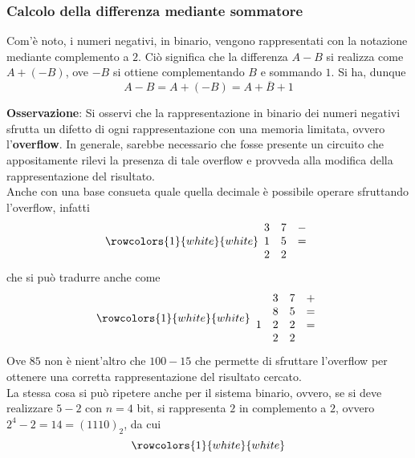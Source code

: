\documentclass[a4paper]{extarticle}
\begin{document}
\subsubsection{Calcolo della differenza mediante sommatore}
Com'è noto, i numeri negativi, in binario, vengono rappresentati con la notazione mediante complemento a \(2\). Ciò significa che la differenza \(A - B\) si realizza come \(A + (- B)\), ove \(- B\) si ottiene complementando \(B\) e sommando \(1\). Si ha, dunque
\[A - B = A + (- B) = A + \overline{B} + 1\]

\vspace{1em}
\noindent
\textbf{Osservazione}: Si osservi che la rappresentazione in binario dei numeri negativi sfrutta un difetto di ogni rappresentazione con una memoria limitata, ovvero l'\textbf{overflow}. In generale, sarebbe necessario che fosse presente un circuito che appositamente rilevi la presenza di tale overflow e provveda alla modifica della rappresentazione del risultato.\\
Anche con una base consueta quale quella decimale è possibile operare sfruttando l'overflow, infatti
\[
    \rowcolors{1}{white}{white}
    \begin{array}{rlc}
         3 & 7 & -\\
         1 & 5 & =\\
         2 & 2 &
    \end{array}
\]
che si può tradurre anche come
\[
    \rowcolors{1}{white}{white}
    \begin{array}{crlc}
         & 3 & 7 & +\\
         & 8 & 5 & =\\
         1 & 2 & 2 & =\\
         & 2 & 2 &
    \end{array}
\]
Ove \(85\) non è nient'altro che \(100 - 15\) che permette di sfruttare l'overflow per ottenere una corretta rappresentazione del risultato cercato.\\
La stessa cosa si può ripetere anche per il sistema binario, ovvero, se si deve realizzare \(5 - 2\) con \(n = 4\) bit, si rappresenta \(2\) in complemento a \(2\), ovvero \(2^4 - 2 = 14 = (1110)_2\), da cui
\[
    \rowcolors{1}{white}{white}
    \begin{array}{cccccc}
    \end{array}
\]
\end{document}
